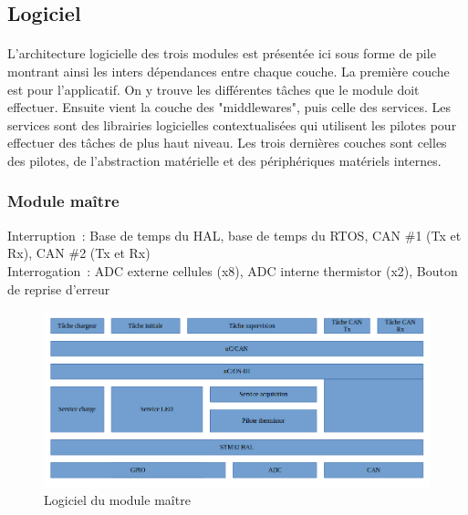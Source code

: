 \subsection{Logiciel}
	\paragraph*{}
	L'architecture logicielle des trois modules est présentée ici sous forme de pile montrant ainsi les inters dépendances entre chaque couche. La première couche est pour l'applicatif. On y trouve les différentes tâches que le module doit effectuer. Ensuite vient la couche des "middlewares", puis celle des services. Les services sont des librairies logicielles contextualisées qui utilisent les pilotes pour effectuer des tâches de plus haut niveau. Les trois dernières couches sont celles des pilotes, de l'abstraction matérielle et des périphériques matériels internes.
	\subsubsection{Module maître}
		\noindent
		Interruption : Base de temps du HAL, base de temps du RTOS, CAN \#1 (Tx et Rx),  CAN \#2 (Tx et Rx) \\
		Interrogation : ADC externe cellules (x8), ADC interne thermistor (x2), Bouton de reprise d’erreur
		\begin{figure}[H]
			\centering
			\includegraphics[scale=0.5]{Images/Logiciel_Master.png}
			\caption{Logiciel du module maître}
			\label{fig:logiciel_master}
		\end{figure}
